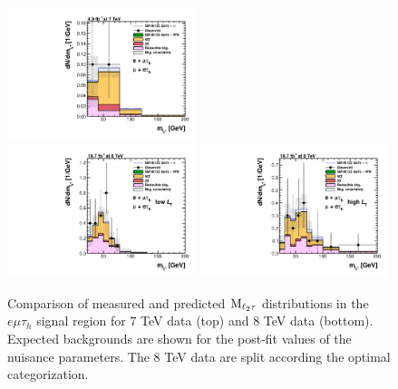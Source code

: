\begin{figure}
\begin{center}
  \includegraphics[width=0.49\textwidth]{4_Analisys/pics/postfit/emt_postfit_7TeV_FitAllChannels.pdf}\\
  \includegraphics[width=0.49\textwidth]{4_Analisys/pics/postfit/emt_low_postfit_8TeV_FitAllChannels.pdf}
  \includegraphics[width=0.49\textwidth]{4_Analisys/pics/postfit/emt_high_postfit_8TeV_FitAllChannels.pdf}\\
  \caption{Comparison of measured and predicted $\rm{M}_{\ell_2\tau}$ distributions in the $e\mu\tau_h$ signal region for 7 TeV data (top) and 8 TeV data (bottom). 
  Expected backgrounds are shown for the post-fit values of the nuisance parameters. 
  The 8 TeV data are split according the optimal categorization.}
  \label{fig:LLT_emt_postfit}
\end{center}

\end{figure}
